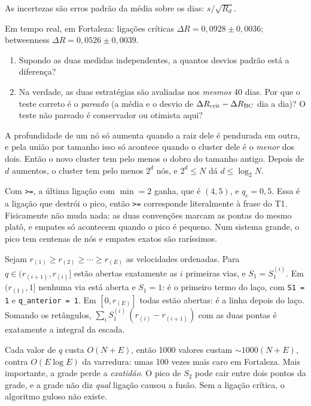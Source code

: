 \documentclass[11pt]{article}
\begin{document}
As incertezas são erros padrão da média sobre os dias: $s/\sqrt{R_d}$.

 Em tempo real, em Fortaleza: ligações críticas $\Delta R = 0{,}0928\pm0{,}0036$; betweenness $\Delta R = 0{,}0526\pm0{,}0039$.
\begin{enumerate}
  \item Supondo as duas medidas independentes, a quantos desvios padrão está a diferença?
  \item Na verdade, as duas estratégias são avaliadas nos \emph{mesmos} 40 dias. Por que o teste correto é o \emph{pareado} (a média e o desvio de $\Delta R_{\rm crit}-\Delta R_{\rm BC}$ dia a dia)? O teste não pareado é conservador ou otimista aqui?
\end{enumerate}

\solucoes

A profundidade de um nó só aumenta quando a raiz dele é pendurada em outra, e pela união por tamanho isso só acontece quando o cluster dele é o \emph{menor} dos dois. Então o novo cluster tem pelo menos o dobro do tamanho antigo. Depois de $d$ aumentos, o cluster tem pelo menos $2^d$ nós, e $2^d\le N$ dá $d\le\log_2N$.

Com \texttt{>=}, a última ligação com $\min=2$ ganha, que é $(4,5)$, e $q_c = 0{,}5$. Essa é a ligação que destrói o pico, então \texttt{>=} corresponde literalmente à frase do T1. Fisicamente não muda nada: as duas convenções marcam as pontas do mesmo platô, e empates só acontecem quando o pico é pequeno. Num sistema grande, o pico tem centenas de nós e empates exatos são raríssimos.

Sejam $r_{(1)}\ge r_{(2)}\ge\cdots\ge r_{(E)}$ as velocidades ordenadas. Para $q\in(r_{(i+1)},r_{(i)}]$ estão abertas exatamente as $i$ primeiras vias, e $S_1 = S_1^{(i)}$. Em $(r_{(1)},1]$ nenhuma via está aberta e $S_1=1$: é o primeiro termo do laço, com \texttt{S1 = 1} e \texttt{q\_anterior = 1}. Em $[0,r_{(E)}]$ todas estão abertas: é a linha depois do laço. Somando os retângulos, $\sum_i S_1^{(i)}\,(r_{(i)}-r_{(i+1)})$ com as duas pontas é exatamente a integral da escada.

Cada valor de $q$ custa $O(N+E)$, então 1000 valores custam $\sim1000(N+E)$, contra $O(E\log E)$ da varredura: umas 100 vezes mais caro em Fortaleza. Mais importante, a grade perde a \emph{exatidão}. O pico de $S_2$ pode cair entre dois pontos da grade, e a grade não diz \emph{qual} ligação causou a fusão. Sem a ligação crítica, o algoritmo guloso não existe.
\end{document}
